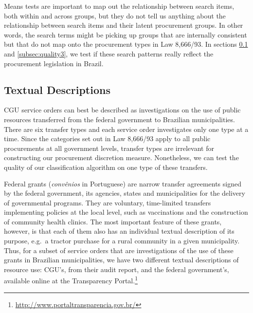 \documentclass[11pt]{article}
\begin{document}
Means tests are important to map out the relationship between search items, both within and across groups, but they do not tell us anything about the relationship between search items and their latent procurement groups. In other words, the search terms might be picking up groups that are internally consistent but that do not map onto the procurement types in Law 8,666/93. In sections \ref{subsec:quality2} and \ref{subsec:quality3}, we test if these search patterns really reflect the procurement legislation in Brazil.

\subsection{Textual Descriptions}\label{subsec:quality2}

CGU service orders can best be described as investigations on the use of
public resources transferred from the federal government to Brazilian
municipalities. There are six transfer types and each service order
investigates only one type at a time. Since the categories
set out in Law 8,666/93 apply to all public procurements at all
government levels, transfer types are irrelevant for constructing our
procurement discretion measure. Nonetheless, we can test the quality of our classification algorithm on one type of these transfers.

Federal grants (\emph{convênios} in Portuguese) are narrow transfer
agreements signed by the federal government, its agencies, states and
municipalities for the delivery of governmental programs. They are
voluntary, time-limited transfers implementing policies at the local
level, such as vaccinations and the construction of community health
clinics. The most important feature of these grants, however, is that
each of them also has an individual textual description of its purpose,
e.g.~a tractor purchase for a rural community in a given municipality.
Thus, for a subset of service orders that are investigations of the use
of these grants in Brazilian municipalities, we have two
different textual descriptions of resource use: CGU's, from their audit
report, and the federal government's, available online at the
Transparency Portal.\footnote{\url{http://www.portaltransparencia.gov.br/}}

\end{document}
